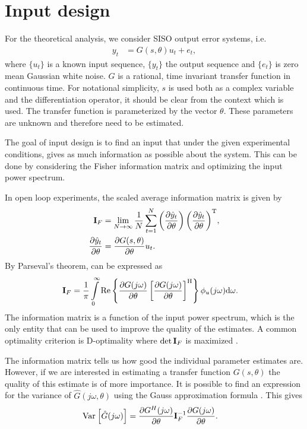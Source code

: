 \section{Input design}\label{sec:inputDesign}
For the theoretical analysis, we consider SISO output error systems, i.e.
\begin{align}
y_t &=G(s,\theta)u_t  + e_t,
\end{align}
where $\{u_t\}$ is a known input sequence, $\{y_t\}$ the output sequence and
$\{e_t\}$ is zero mean Gaussian white noise.
$G$ is a rational, time invariant transfer function in continuous time. For notational simplicity, $s$ is used both as a complex variable and the differentiation operator, it should be clear from the context which is used. The transfer function is parameterized by the vector $\theta$. These parameters are unknown and therefore need to be estimated. 

The goal of input design is to find an input that under the given experimental conditions, gives as much information as possible about the system. This can be done by considering the Fisher information matrix and optimizing the input power spectrum. 

In open loop experiments, the scaled average information matrix is given by
\begin{align}
\mathbf{I}_F & = \lim_{N\rightarrow\infty}
          \frac{1}{N}
            \sum_{t=1}^{N}
              {\left(\frac{\partial\hat{y}_t}{\partial\theta}\right)
               \left(\frac{\partial\hat{y}_t}{\partial\theta}\right)^{\mathrm{T}}},\\
\frac{\partial\hat{y}_t}{\partial\theta}
    & =\frac{\partial G(s,\theta)}{\partial \theta}u_t.
\end{align}
By Parseval's theorem, \IF can be expressed as
\begin{align}
\mathbf{I}_F &= \frac{1}{\pi}
         \int\limits_0^\infty \mathrm{Re}
           \left\{      \frac{\partial G(j\omega)}{\partial \theta}
                  \left[\frac{\partial G(j\omega)}{\partial \theta}\right]^{\mathrm{H}}
           \right\}
           \phi_u(j\omega)
           \mathrm{d}{\omega} \text{.}
\label{eq:IF}
\end{align}
The information matrix is a function of the input power spectrum, which is the only entity that can be used to improve the quality of the estimates. A common optimality criterion is D-optimality where $\det{\ensuremath{\mathbf{I}_F}}$ is maximized \citep{Goodwin1977}.

The information matrix tells us how good the individual parameter estimates are. However, if we are interested in estimating a transfer function $G(s,\theta)$ the quality of this estimate is of more importance. It is possible to find an expression for the variance of $\hat{G}(j\omega,\theta)$ using the Gauss approximation formula \citep{Ljung1999, Pintelon2012}. This gives
\begin{align}
\operatorname{\mathrm{Var}}_{} \left[ \hat{G}(j\omega) \right] &= \frac{\partial G^H(j\omega)}{\partial \theta}\mathbf{I}_F^{-1}\frac{\partial G(j\omega)}{\partial \theta}.
\label{eq:varG}
\end{align}

